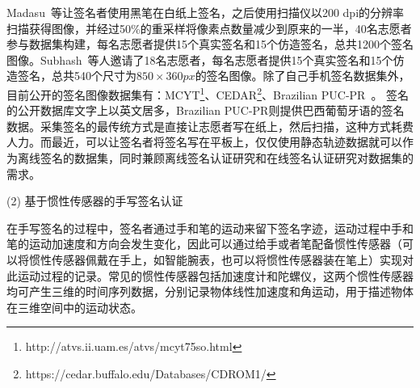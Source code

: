 Madasu~\cite{Hanmandlu2005Off}等让签名者使用黑笔在白纸上签名，之后使用扫描仪以200 dpi的分辨率扫描获得图像，并经过50\%的重采样将像素点数量减少到原来的一半，40名志愿者参与数据集构建，每名志愿者提供15个真实签名和15个仿造签名，总共1200个签名图像。Subhash~\cite{chandra2016offline}等人邀请了18名志愿者，每名志愿者提供15个真实签名和15个仿造签名，总共540个尺寸为$850\times360px$的签名图像。除了自己手机签名数据集外，目前公开的签名图像数据集有：MCYT\footnote{http://atvs.ii.uam.es/atvs/mcyt75so.html}、CEDAR\footnote{https://cedar.buffalo.edu/Databases/CDROM1/}、Brazilian PUC-PR~\cite{freitas2008brazilian}。 签名的公开数据库文字上以英文居多，Brazilian PUC-PR则提供巴西葡萄牙语的签名数据。采集签名的最传统方式是直接让志愿者写在纸上，然后扫描，这种方式耗费人力。而最近，可以让签名者将签名写在平板上，仅仅使用静态轨迹数据就可以作为离线签名的数据集，同时兼顾离线签名认证研究和在线签名认证研究对数据集的需求。

(2) 基于惯性传感器的手写签名认证
  
在手写签名的过程中，签名者通过手和笔的运动来留下签名字迹，运动过程中手和笔的运动加速度和方向会发生变化，因此可以通过给手或者笔配备惯性传感器（可以将惯性传感器佩戴在手上，如智能腕表，也可以将惯性传感器装在笔上）实现对此运动过程的记录。常见的惯性传感器包括加速度计和陀螺仪，这两个惯性传感器均可产生三维的时间序列数据，分别记录物体线性加速度和角运动，用于描述物体在三维空间中的运动状态。

